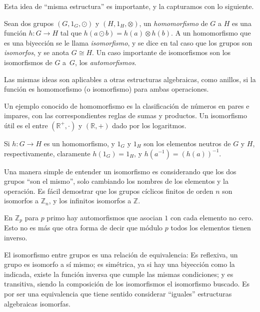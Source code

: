   Esta idea de ``misma estructura'' es importante,
  y la capturamos con lo siguiente.
  \begin{definition}
    \label{def:group-isomorphism}
    Sean dos grupos \((G, 1_G, \odot)\) y \((H, 1_H, \otimes)\),
    un \emph{homomorfismo} de \(G\) a \(H\)%
    es una función \(h \colon G \rightarrow H\)
    tal que \(h(a \odot b) = h(a) \otimes h(b)\).
    A un homomorfismo que es una biyección se le llama \emph{isomorfismo},%
    y se dice en tal caso que los grupos son \emph{isomorfos},
    y se anota \(G \cong H\).
    Un caso importante de isomorfismos son los isomorfismos
    de \(G\) a~\(G\),
    los \emph{automorfismos}.%
  \end{definition}
  Las mismas ideas son aplicables a otras estructuras algebraicas,
  como anillos,
  si la función es homomorfismo
  (o isomorfismo)
  para ambas operaciones.%

  Un ejemplo conocido de homomorfismo
  es la clasificación de números en pares e impares,
  con las correspondientes reglas de sumas y productos.
  Un isomorfismo útil es el entre \((\mathbb{R}^+, \cdot)\)
  y \((\mathbb{R}, +)\) dado por los logaritmos.


  Si \(h \colon G \rightarrow H\) es un homomorfismo,
  y \(1_G\) y \(1_H\) son los elementos neutros de \(G\) y \(H\),
  respectivamente,
  claramente \(h(1_G) = 1_H\),
  y \(h(a^{-1}) = (h(a))^{-1}\).

  Una manera simple de entender un isomorfismo es considerando
  que los dos grupos ``son el mismo'',
  solo cambiando los nombres de los elementos y la operación.
  Es fácil demostrar que los grupos cíclicos finitos de orden \(n\)
  son isomorfos a \(\mathbb{Z}_n\),
  y los infinitos isomorfos a \(\mathbb{Z}\).

  En \(\mathbb{Z}_p\) para \(p\) primo
  hay automorfismos que asocian \(1\) con cada elemento no cero.
  Esto no es más que otra forma de decir que módulo \(p\)
  todos los elementos tienen inverso.

  El isomorfismo entre grupos es una relación de equivalencia:%
  Es reflexiva,
  un grupo es isomorfo a sí mismo;
  es simétrica,
  ya si hay una biyección como la indicada,
  existe la función inversa que cumple las mismas condiciones;
  y es transitiva,
  siendo la composición de los isomorfismos el isomorfismo buscado.
  Es por ser una equivalencia que tiene sentido considerar ``iguales''
  estructuras algebraicas isomorfas.

